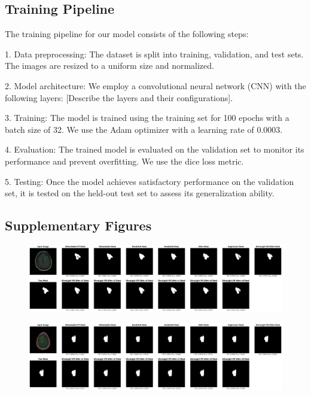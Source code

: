 \documentclass[conference]{IEEEtran}
\begin{document}





\appendix
\renewcommand{\thesection}{\Alph{section}}
\subsection{Training Pipeline}
The training pipeline for our model consists of the following steps:

1. Data preprocessing: The dataset is split into training, validation, and test sets. The images are resized to a uniform size and normalized.

2. Model architecture: We employ a convolutional neural network (CNN) with the following layers: [Describe the layers and their configurations].

3. Training: The model is trained using the training set for 100 epochs with a batch size of 32. We use the Adam optimizer with a learning rate of 0.0003.

4. Evaluation: The trained model is evaluated on the validation set to monitor its performance and prevent overfitting. We use the dice loss metric.

5. Testing: Once the model achieves satisfactory performance on the validation set, it is tested on the held-out test set to assess its generalization ability.

\subsection{Supplementary Figures} \label{supp_figs}

\begin{figure}[!h]
    \centering
    \includegraphics[width=\textwidth]{imgs/14_9.png}
\end{figure}

\begin{figure}[!h]
    \centering
    \includegraphics[width=\textwidth]{imgs/22_4.png}
\end{figure}
\end{document}
